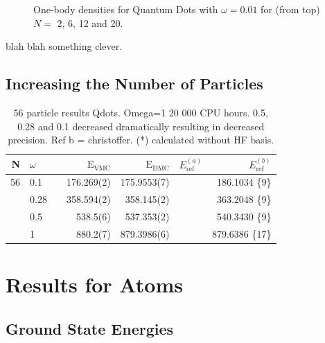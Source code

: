 \begin{figure}
\begin{center}
  \caption{One-body densities for Quantum Dots with $\omega=0.01$ for (from top) $N=$ 2, 6, 12 and 20.}
  \label{fig:OBD_pure_w001}
 \end{center}
\end{figure}

blah blah something clever.

 
 \clearpage

 \subsection{Increasing the Number of Particles}
 
 \begin{table}
\begin{center}
\begin{tabular}{rlp{2cm}|rrrr}
    N     & $\omega$& & $\mathrm{E_{VMC}}$ & $\mathrm{E_{DMC}}$ & $E_\mathrm{ref}^{(a)}$& $E_\mathrm{ref}^{(b)}$ \\
\hline\hline
   56     & 0.1     & & 176.269(2) & 175.9553(7) & & 186.1034 \{9\} \\
          & 0.28    & & 358.594(2) & 358.145(2)  & & 363.2048 \{9\}  \\
          & 0.5     & & 538.5(6)   & 537.353(2)  & & 540.3430 \{9\}  \\
          & 1       & & 880.2(7)   & 879.3986(6) & & 879.6386 \{17\} \\
\hline\hline
\end{tabular}
\caption{56 particle results Qdots. Omega=1 20 000 CPU hours. 0.5, 0.28 and 0.1 decreased dramatically resulting in decreased precision. Ref b = christoffer. (*) calculated without HF basis.}
\end{center}
\end{table}
 
 
 \section{Results for Atoms}
 
 \subsection{Ground State Energies}
 
